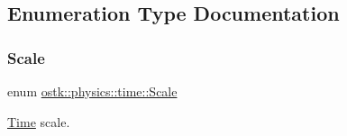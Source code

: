 \subsection{Enumeration Type Documentation}
\mbox{\label{namespaceostk_1_1physics_1_1time_adf23d37bd8641fb76a0e98ab46a70df7}} 
\subsubsection{\texorpdfstring{Scale}{Scale}}
{\footnotesize\ttfamily enum \hyperlink{namespaceostk_1_1physics_1_1time_adf23d37bd8641fb76a0e98ab46a70df7}{ostk\+::physics\+::time\+::\+Scale}\hspace{0.3cm}{\ttfamily [strong]}}



\hyperlink{classostk_1_1physics_1_1time_1_1_time}{Time} scale. 

